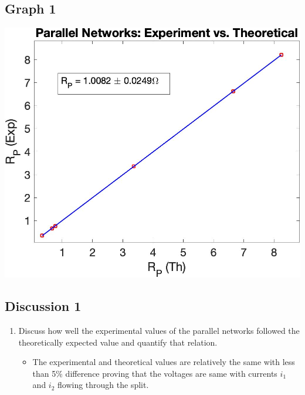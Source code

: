 \documentclass{article}
\begin{document}
\begin{table}[!htp]
\begin{center}
    \subsection*{Graph 1}
    \includegraphics[scale=0.18]{parallel.jpeg}
    \subsection*{Discussion 1}
    \begin{enumerate}
      \item Discuss how well the experimental values of the parallel networks followed the theoretically expected value and quantify that relation.
      \begin{itemize}
        \item The experimental and theoretical values are relatively the same with less than 5\% difference proving that the voltages are same with currents \(i_1\) and \(i_2\) flowing through the split.
      \end{itemize}
    \end{enumerate}
  \end{center}
\end{table}
\newpage
\end{document}
